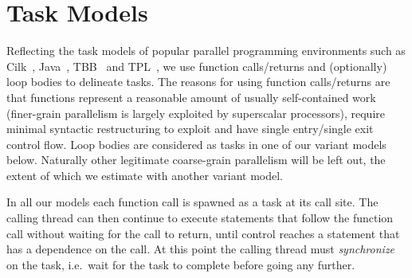 \section{Task Models} \label{smethod}

Reflecting the task models of popular parallel programming environments such as Cilk~\cite{blumofe96cilk},
Java~\cite{lea00java}, TBB~\cite{reinders07intel} and TPL~\cite{leijen07parallel},
we use function calls/returns and (optionally) loop bodies to delineate tasks.
The reasons for using function calls/returns are that functions represent a reasonable amount of usually self-contained work (finer-grain parallelism is largely exploited by superscalar processors), require minimal syntactic restructuring to exploit and have single entry/single exit control flow.
Loop bodies are considered as tasks in one of our variant models below.
Naturally other legitimate coarse-grain parallelism will be left out,
the extent of which we estimate with another variant model.

In all our models each function call is spawned as a task at its call site.
The calling thread can then continue to execute statements that follow the function call without waiting for the call to return,
until control reaches a statement that has a dependence on the call.
At this point the calling thread must \emph{synchronize} on the task,
i.e.\ wait for the task to complete before going any further.

